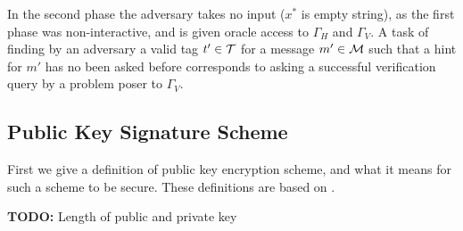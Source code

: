 \documentclass[11pt,a4paper,titlepage]{memoir}
\begin{document}
In the second phase the adversary takes no input ($x^*$ is empty string), as the first phase was non-interactive, and
is given oracle access to $\Gamma_H$ and $\Gamma_V$.
A task of finding by an adversary a valid tag $t' \in \mathcal{T}$ for a message $m' \in \mathcal{M}$ such that a hint for $m'$ has no been asked before
corresponds to asking a successful verification query by a problem poser to $\Gamma_V$.
%
\subsection{Public Key Signature Scheme}
First we give a definition of public key encryption scheme, and what it means for such a scheme to be secure.
These definitions are based on \cite{Goldreich:2004:FCV:975541}.

\begin{todo}
  \textbf{TODO:} Length of public and private key
\end{todo}
\end{document}
